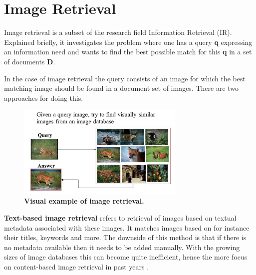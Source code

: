 \documentclass{article}
\begin{document}
\cite{herley2006argos} %
\cite{berrani2008non} %

\cite{benezeth2010unsupervised} %
\cite{ibrahim2011tv} %
\cite{abduraman2011unsupervised} %
\fi


\section{Image Retrieval} \label{section:imageretrieval}
Image retrieval is a subset of the research field Information Retrieval (IR). Explained briefly, it investigates the problem where one has a query \textbf{q} expressing an information need and wants to find the best possible match for this \textbf{q} in a set of documents \textbf{D}.

In the case of image retrieval the query consists of an image for which the best matching image should be found in a document set of images. There are two approaches for doing this.

\begin{figure}[H]
	\includegraphics[width=8cm]{images/imageretrieval.png}
	\centering
	\caption{\textbf{Visual example of image retrieval.}}
	\label{fig:imageretrieval}
\end{figure}

\textbf{Text-based image retrieval} refers to retrieval of images based on textual metadata associated with these images. It matches images based on for instance their titles, keywords and more. The downside of this method is that if there is no metadata available then it needs to be added manually. With the growing sizes of image databases this can become quite inefficient, hence the more focus on content-based image retrieval in past years \cite{rajam2013survey}.
\end{document}

